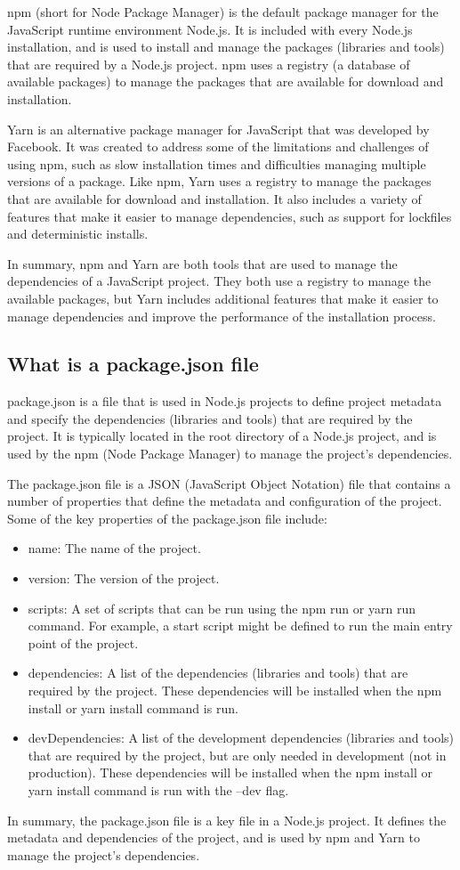 {npm (short for Node Package Manager) is the default package manager for the JavaScript runtime environment Node.js. It is included with every Node.js installation, and is used to install and manage the packages (libraries and tools) that are required by a Node.js project. npm uses a registry (a database of available packages) to manage the packages that are available for download and installation.

Yarn is an alternative package manager for JavaScript that was developed by Facebook. It was created to address some of the limitations and challenges of using npm, such as slow installation times and difficulties managing multiple versions of a package. Like npm, Yarn uses a registry to manage the packages that are available for download and installation. It also includes a variety of features that make it easier to manage dependencies, such as support for lockfiles and deterministic installs.

In summary, npm and Yarn are both tools that are used to manage the dependencies of a JavaScript project. They both use a registry to manage the available packages, but Yarn includes additional features that make it easier to manage dependencies and improve the performance of the installation process.


\subsection{What is a package.json file}
package.json is a file that is used in Node.js projects to define project metadata and specify the dependencies (libraries and tools) that are required by the project. It is typically located in the root directory of a Node.js project, and is used by the npm (Node Package Manager) to manage the project's dependencies.

The package.json file is a JSON (JavaScript Object Notation) file that contains a number of properties that define the metadata and configuration of the project. Some of the key properties of the package.json file include:
\begin{itemize}
\item name: The name of the project.
\item version: The version of the project.
\item scripts: A set of scripts that can be run using the npm run or yarn run command. For example, a start script might be defined to run the main entry point of the project.
\item dependencies: A list of the dependencies (libraries and tools) that are required by the project. These dependencies will be installed when the npm install or yarn install command is run.
\item devDependencies: A list of the development dependencies (libraries and tools) that are required by the project, but are only needed in development (not in production). These dependencies will be installed when the npm install or yarn install command is run with the --dev flag.
\end{itemize}
In summary, the package.json file is a key file in a Node.js project. It defines the metadata and dependencies of the project, and is used by npm and Yarn to manage the project's dependencies.
}
